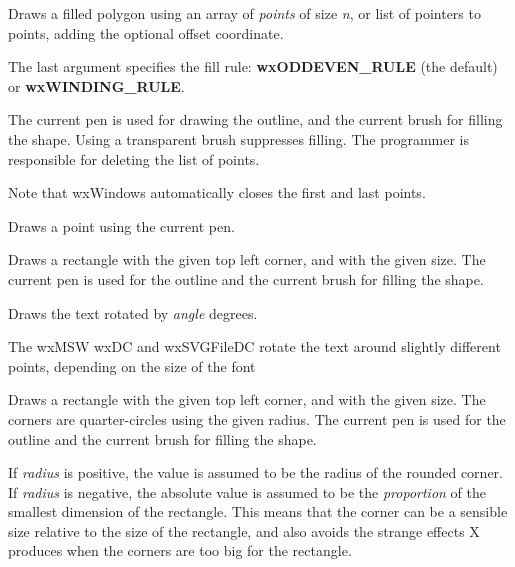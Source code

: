 Draws a filled polygon using an array of {\it points} of size {\it n},
or list of pointers to points, adding the optional offset coordinate.

The last argument specifies the fill rule: {\bf wxODDEVEN\_RULE} (the
default) or {\bf wxWINDING\_RULE}.

The current pen is used for drawing the outline, and the current brush
for filling the shape.  Using a transparent brush suppresses filling.
The programmer is responsible for deleting the list of points.

Note that wxWindows automatically closes the first and last points.


\label{wxsvgfiledcdrawpoint}


Draws a point using the current pen.

\label{wxsvgfiledcdrawrectangle}


Draws a rectangle with the given top left corner, and with the given
size.  The current pen is used for the outline and the current brush
for filling the shape.

\label{wxsvgfiledcdrawrotatedtext}


Draws the text rotated by {\it angle} degrees.

The wxMSW wxDC and wxSVGFileDC rotate the text around slightly different points, depending on the size of the font

\label{wxsvgfiledcdrawroundedrectangle}


Draws a rectangle with the given top left corner, and with the given
size.  The corners are quarter-circles using the given radius. The
current pen is used for the outline and the current brush for filling
the shape.

If {\it radius} is positive, the value is assumed to be the
radius of the rounded corner. If {\it radius} is negative,
the absolute value is assumed to be the {\it proportion} of the smallest
dimension of the rectangle. This means that the corner can be
a sensible size relative to the size of the rectangle, and also avoids
the strange effects X produces when the corners are too big for
the rectangle.

